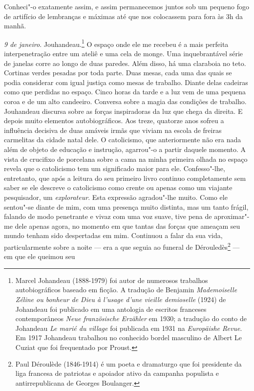 Conheci"-o exatamente assim, e assim permanecemos juntos sob um pequeno
fogo de artifício de lembranças e máximas até que nos colocassem para
fora às 3h da manhã.

\emph{9 de janeiro}. Jouhandeau.\footnote{Marcel Johandeau
  (1888-1979) foi autor de numerosos trabalhos autobiográficos baseado
  em ficção. A tradução de Benjamin \emph{Mademoiselle Zéline ou bonheur
  de Dieu à l'usage d'une vieille demioselle} (1924) de Johandeau foi
  publicado em uma antologia de escritos franceses contemporâneos
  \emph{Neue französische Erzähler} em 1930; a tradução do conto de
  Johandeau \emph{Le marié du village} foi publicada em 1931 na
  \emph{Europäishe Revue}. Em 1917 Johandeau trabalhou no conhecido
  bordel masculino de Albert Le Cuziat que foi frequentado por Proust. \versal{[N. E.]}}
O espaço onde ele me recebeu é a mais perfeita interpenetração entre um
ateliê e uma cela de monge. Uma inquebrantável série de janelas corre ao
longo de duas paredes. Além disso, há uma claraboia no teto. Cortinas
verdes pesadas por toda parte. Duas mesas, cada uma das quais se podia
considerar com igual justiça como mesas de trabalho. Diante delas
cadeiras como que perdidas no espaço. Cinco horas da tarde e a luz vem
de uma pequena coroa e de um alto candeeiro. Conversa sobre a magia das
condições de trabalho. Jouhandeau discursa sobre as forças inspiradoras
da luz que chega da direita. E depois muito elementos autobiográficos.
Aos treze, quatorze anos sofreu a influência decisiva de duas amáveis
irmãs que viviam na escola de freiras carmelitas da cidade natal dele. O
catolicismo, que anteriormente não era nada além de objeto de educação e
instrução, agarrou"-o a partir daquele momento. A vista de crucifixo de
porcelana sobre a cama na minha primeira olhada no espaço revela que o
catolicismo tem um significado maior para ele. Confesso"-lhe, entretanto,
que após a leitura do seu primeiro livro continuo completamente sem
saber se ele descreve o catolicismo como crente ou apenas como um
viajante pesquisador, um \emph{explorateur}. Esta expressão agradou"-lhe
muito. Como ele sentou"-se diante de mim, com uma presença muito
distinta, mas um tanto frágil, falando de modo penetrante e vivaz com
uma voz suave, tive pena de aproximar"-me dele apenas agora, no momento
em que tantas das forças que ameaçam seu mundo tenham sido despertadas
em mim. Continuou a falar da sua vida, particularmente sobre a noite ---
era a que seguia ao funeral de Dérouledès\footnote{Paul Déroulède
  (1846-1914) é um poeta e dramaturgo que foi presidente da liga
  francesa de patriotas e apoiador ativo da campanha populista e
  antirrepublicana de Georges Boulanger. \versal{[N. E.]}} --- em que ele queimou seu
